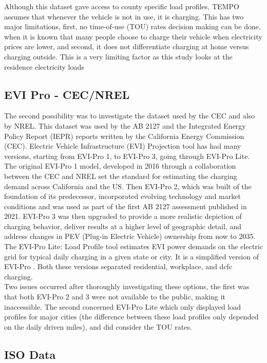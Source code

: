 \documentclass{article}
\begin{document}
Although this dataset gave access to county specific load profiles, TEMPO assumes that whenever the vehicle is not in use, it is charging. This has two major limitations, first, no time-of-use (TOU) rates decision making can be done, when it is known that many people choose to charge their vehicle when electricity prices are lower, and second, it does not differentiate charging at home versus charging outside. This is a very limiting factor as this study looks at the residence electricity loads

\subsection{EVI Pro - CEC/NREL}

The second possibility was to investigate the dataset used by the CEC and also by NREL. This dataset was used by the AB 2127 \cite{AB2127Report} and the Integrated
Energy Policy Report (IEPR) \cite{IEPRReport} reports written by the California Energy Commission (CEC). Electric Vehicle Infrastructure (EVI) Projection tool has had many versions, starting from EVI-Pro 1, to EVI-Pro 3, going through EVI-Pro Lite. The original EVI-Pro 1 model, developed in 2016 through a collaboration between the CEC and NREL set the standard for estimating the charging demand across California and the US. Then EVI-Pro 2, which was built of the foundation of its predecessor, incorporated evolving technology and market conditions and was used as part of the first AB 2127 assessment published in 2021. EVI-Pro 3 was then upgraded to provide a more realistic depiction of charging behavior, deliver results at a higher level of geographic detail, and address changes in PEV (Plug-in Electric Vehicle) ownership from now to 2035. The EVI-Pro Lite: Load Profile tool estimates EVI power demands on the electric grid for typical daily charging in a given state or city. It is a simplified version of EVI-Pro \cite{EVIPROLite}. Both these versions separated residential, workplace, and dcfc charging. \\

Two issues occurred after thoroughly investigating these options, the first was that both EVI-Pro 2 and 3 were not available to the public, making it inaccessible. The second concerned EVI-Pro Lite which only displayed load profiles for major cities (the difference between these load profiles only depended on the daily driven miles), and did consider the TOU rates. 

\subsection{ISO Data}
\end{document}
